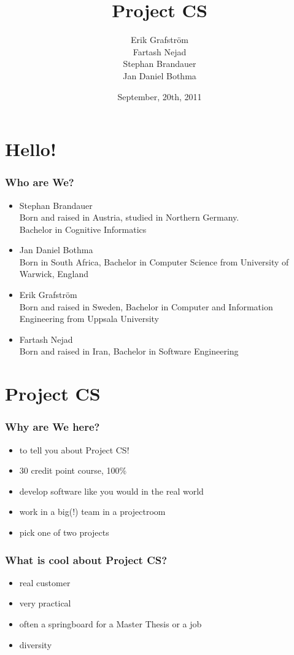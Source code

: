 \documentclass{beamer}
\author{Erik Grafstr\"{o}m \\
        Fartash Nejad \\
        Stephan Brandauer \\
        Jan Daniel Bothma}
\date{September, 20th, 2011}
\institute{Uppsala University\\Department of Information Technology}
\title{Project CS}
\begin{document}
\begin{frame}[plain]
  \titlepage
\end{frame}

\section{Hello!}
\begin{frame}
  \frametitle{Who are We?}
  \begin{itemize}
    \item Stephan Brandauer\\
      {\small Born and raised in Austria, studied in Northern Germany. \\
      Bachelor in Cognitive Informatics}
    \item Jan Daniel Bothma\\
      {\small Born in South Africa, 
      Bachelor in Computer Science from University of Warwick, England}
    \item Erik Grafstr\"{o}m\\
      {\small Born and raised in Sweden, 
      Bachelor in Computer and Information Engineering from Uppsala University}
    \item Fartash Nejad\\
      {\small Born and raised in Iran, 
      Bachelor in Software Engineering}	
  \end{itemize}
\end{frame}

\section{Project CS}

\begin{frame}
  \frametitle{Why are We here?}
  \begin{itemize}
    \item<1-> to tell you about Project CS!
    \item<2-> 30 credit point course, 100\%
    \item<3-> develop software like you would in the real world
    \item<4-> work in a big(!) team in a projectroom
    \item<5-> pick one of two projects
  \end{itemize}
\end{frame}

\begin{frame}
  \frametitle{What is cool about Project CS?}
  \begin{itemize}
    \item<1-> real customer
    \item<2-> very practical
    \item<3-> often a springboard for a Master Thesis or a job
    \item<4-> diversity
  \end{itemize}
\end{frame}
\end{document}
